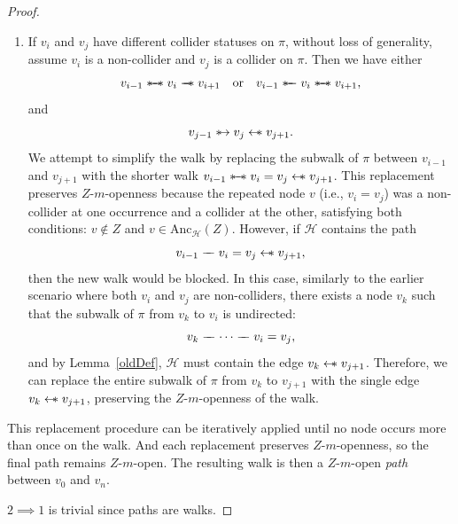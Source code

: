 \documentclass[accepted]{uai2025} %
\newcommand{\anc}{\text{Anc}}
\newcommand{\hus}{\mathrel{{\leftarrow\mkern-11mu\ast}}}
\newcommand{\suh}{\mathrel{{\ast\mkern-11mu\to}}}
\newcommand{\sut}{\mathrel{{\ast\mkern-11mu\relbar\mkern-9mu\relbar}}}
\newcommand{\tus}{\mathrel{{\relbar\mkern-11mu\relbar\mkern-11mu\ast}}}
\newcommand{\sus}{\mathrel{{\ast\mkern-11mu\relbar\mkern-9mu\relbar\mkern-11mu\ast}}}
\newcommand{\tut}{\mathrel{{\relbar\mkern-9mu\relbar}}}
\begin{document}
\begin{proof}
\begin{enumerate}
\begin{enumerate}
        \item If \( v_i \) and \( v_j \) have different collider statuses on \( \pi \), without loss of generality, assume \( v_i \) is a non-collider and \( v_j \) is a collider on \( \pi \). Then we have either
        \[
        v_{i-1} \sus v_i \tus v_{i+1} \quad \text{or} \quad v_{i-1} \sut v_i \sus v_{i+1},
        \]
        and
        \[
        v_{j-1} \suh v_j \hus v_{j+1}.
        \]
        We attempt to simplify the walk by replacing the subwalk of \( \pi \) between \( v_{i-1} \) and \( v_{j+1} \) with the shorter walk $v_{i-1} \sus v_i = v_j \hus v_{j+1}$. This replacement preserves \( Z \)-\( m \)-openness because the repeated node \( v \) (i.e., \( v_i = v_j \)) was a non-collider at one occurrence and a collider at the other, satisfying both conditions: \( v \notin Z \) and \( v \in \anc_\mathcal{H}(Z) \). However, if \( \mathcal{H} \) contains the path
        \[
        v_{i-1} \tut v_i = v_j \hus v_{j+1},
        \]
        then the new walk would be blocked. In this case, similarly to the earlier scenario where both \( v_i \) and \( v_j \) are non-colliders, there exists a node \( v_k \) such that the subwalk of \( \pi \) from \( v_k \) to \( v_i \) is undirected:
        \[
        v_k \tut \cdots \tut v_i = v_j,
        \]
        and by Lemma~\ref{oldDef}, \( \mathcal{H} \) must contain the edge \( v_k \hus v_{j+1} \). Therefore, we can replace the entire subwalk of $\pi$ from \( v_k \) to \( v_{j+1} \) with the single edge \( v_k \hus v_{j+1} \), preserving the \( Z \)-\( m \)-openness of the walk.
    \end{enumerate}
\end{enumerate}

This replacement procedure can be iteratively applied until no node occurs more than once on the walk. And each replacement preserves $Z$-$m$-openness, so the final path remains $Z$-$m$-open. The resulting walk is then a $Z$-$m$-open \emph{path} between \( v_0 \) and \( v_n \).

$2 \implies 1$ is trivial since paths are walks.
\end{proof}
\end{document}
